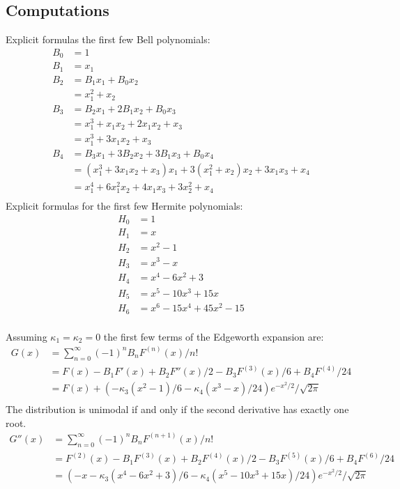 \documentclass[11pt]{article}
\theoremstyle{remark}
\begin{document}
\subsection{Computations}
Explicit formulas the first few Bell polynomials:
\begin{align*}
B_0 &= 1\\
B_1 &= x_1\\
B_2 &= B_1 x_1 + B_0 x_2\\
&= x_1^2 + x_2\\
B_3 &= B_2 x_1 + 2B_1 x_2 + B_0 x_3\\
&= x_1^3 + x_1 x_2 + 2x_1 x_2 + x_3\\
&= x_1^3 + 3x_1 x_2 + x_3\\
B_4 &= B_3 x_1 + 3 B_2 x_2 + 3 B_1 x_3 + B_0 x_4\\
&= (x_1^3 + 3x_1 x_2 + x_3) x_1  + 3 (x_1^2 + x_2)x_2 + 3 x_1 x_3 + x_4\\
&= x_1^4 + 6x_1^2 x_2 + 4 x_1 x_3 + 3x_2^2 + x_4\\
\end{align*}
Explicit formulas for the first few Hermite polynomials:
\begin{align*}
H_0 &= 1\\
H_1 &= x\\
H_2 &= x^2 - 1\\
H_3 &= x^3 - x\\
H_4 &= x^4 - 6x^2 + 3\\
H_5 &= x^5 - 10x^3 + 15x\\
H_6 &= x^6 - 15x^4 + 45x^2 - 15\\
\end{align*}

Assuming \(\kappa_1 = \kappa_2 = 0\) the first few terms of the Edgeworth expansion are:
\begin{align*}
G(x) &= \sum_{n=0}^\infty (-1)^n B_n F^{(n)}(x)/n!\\
&= F(x) - B_1 F'(x) + B_2F''(x)/2 - B_3F^{(3)}(x)/6 + B_4F^{(4)}/24\\
&= F(x) + (-\kappa_3 (x^2 - 1)/6 - \kappa_4 (x^3-x)/24)e^{-x^2/2}/\sqrt{2\pi}\\
\end{align*}
The distribution is unimodal if and only if the second derivative has exactly one root.
\begin{align*}
G''(x) &= \sum_{n=0}^\infty (-1)^n B_n F^{(n+1)}(x)/n!\\
&= F^{(2)}(x) - B_1 F^{(3)}(x) + B_2F^{(4)}(x)/2 - B_3F^{(5)}(x)/6 + B_4F^{(6)}/24\\
&= (-x - \kappa_3 (x^4 - 6x^2 + 3)/6
	 - \kappa_4 (x^5 - 10x^3 + 15x)/24)e^{-x^2/2}/\sqrt{2\pi}\\
\end{align*}
\end{document}
